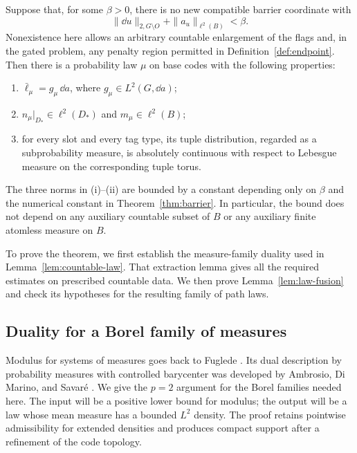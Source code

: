 \begin{theorem}\label{thm:positive-law}
Suppose that, for some \(\beta>0\), there is no new compatible barrier
coordinate with
\[
 \|\dd u\|_{2,G\setminus O}+\|a_u\|_{\ell^2(B)}<\beta.
\]
Nonexistence here allows an arbitrary countable enlargement of the flags and,
in the gated problem, any penalty region permitted in
Definition~\ref{def:endpoint}.  Then there is a probability law \(\mu\) on
base codes with the following properties:
\begin{enumerate}[label=\textup{(\roman*)}]
\item \(\bar\ell_\mu=g_\mu\,\dd a\), where
      \(g_\mu\in L^2(G,\dd a)\);
\item \(n_\mu|_{D_*}\in\ell^2(D_*)\) and
      \(m_\mu\in\ell^2(B)\);
\item for every slot and every tag type, its tuple distribution, regarded as
      a subprobability measure, is absolutely continuous with respect to
      Lebesgue measure on the corresponding tuple torus.
\end{enumerate}
The three norms in \textup{(i)--(ii)} are bounded by a constant depending only
on \(\beta\) and the numerical constant in Theorem~\ref{thm:barrier}.
In particular, the bound does not depend on any auxiliary countable subset of
\(B\) or any auxiliary finite atomless measure on \(B\).
\end{theorem}

To prove the theorem, we first establish the measure-family duality used
in Lemma~\ref{lem:countable-law}.  That extraction lemma gives all the
required estimates on prescribed countable data.  We then prove
Lemma~\ref{lem:law-fusion} and check its hypotheses for the resulting
family of path laws.

\subsection{Duality for a Borel family of measures}

Modulus for systems of measures goes back to Fuglede
\cite[Chapter~I]{Fuglede1957}.  Its dual description by probability
measures with controlled barycenter was developed by Ambrosio,
Di Marino, and Savar\'e
\cite[Theorem~5.1 and Corollary~5.2\textup{(b)}]{AmbrosioDiMarinoSavare2015}.
We give the $p=2$ argument for the Borel families needed here.  The input
will be a positive lower bound for modulus; the output will be a law
whose mean measure has a bounded $L^2$ density.  The proof retains
pointwise admissibility for extended densities and produces compact
support after a refinement of the code topology.

